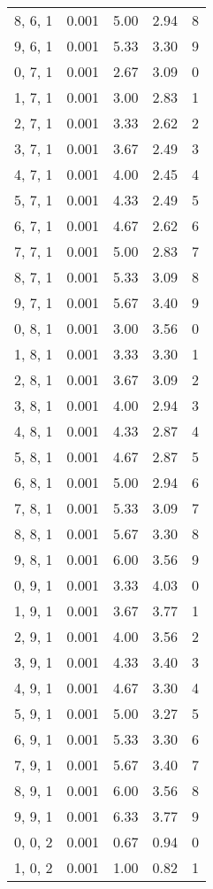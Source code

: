 \documentclass[12pt]{article}
\begin{document}
\begin{tabular}{c || c || c | c | c}
8, 6, 1 & 0.001 & 5.00 & 2.94 & 8 \\
9, 6, 1 & 0.001 & 5.33 & 3.30 & 9 \\
0, 7, 1 & 0.001 & 2.67 & 3.09 & 0 \\
1, 7, 1 & 0.001 & 3.00 & 2.83 & 1 \\
2, 7, 1 & 0.001 & 3.33 & 2.62 & 2 \\
3, 7, 1 & 0.001 & 3.67 & 2.49 & 3 \\
4, 7, 1 & 0.001 & 4.00 & 2.45 & 4 \\
5, 7, 1 & 0.001 & 4.33 & 2.49 & 5 \\
6, 7, 1 & 0.001 & 4.67 & 2.62 & 6 \\
7, 7, 1 & 0.001 & 5.00 & 2.83 & 7 \\
8, 7, 1 & 0.001 & 5.33 & 3.09 & 8 \\
9, 7, 1 & 0.001 & 5.67 & 3.40 & 9 \\
0, 8, 1 & 0.001 & 3.00 & 3.56 & 0 \\
1, 8, 1 & 0.001 & 3.33 & 3.30 & 1 \\
2, 8, 1 & 0.001 & 3.67 & 3.09 & 2 \\
3, 8, 1 & 0.001 & 4.00 & 2.94 & 3 \\
4, 8, 1 & 0.001 & 4.33 & 2.87 & 4 \\
5, 8, 1 & 0.001 & 4.67 & 2.87 & 5 \\
6, 8, 1 & 0.001 & 5.00 & 2.94 & 6 \\
7, 8, 1 & 0.001 & 5.33 & 3.09 & 7 \\
8, 8, 1 & 0.001 & 5.67 & 3.30 & 8 \\
9, 8, 1 & 0.001 & 6.00 & 3.56 & 9 \\
0, 9, 1 & 0.001 & 3.33 & 4.03 & 0 \\
1, 9, 1 & 0.001 & 3.67 & 3.77 & 1 \\
2, 9, 1 & 0.001 & 4.00 & 3.56 & 2 \\
3, 9, 1 & 0.001 & 4.33 & 3.40 & 3 \\
4, 9, 1 & 0.001 & 4.67 & 3.30 & 4 \\
5, 9, 1 & 0.001 & 5.00 & 3.27 & 5 \\
6, 9, 1 & 0.001 & 5.33 & 3.30 & 6 \\
7, 9, 1 & 0.001 & 5.67 & 3.40 & 7 \\
8, 9, 1 & 0.001 & 6.00 & 3.56 & 8 \\
9, 9, 1 & 0.001 & 6.33 & 3.77 & 9 \\
0, 0, 2 & 0.001 & 0.67 & 0.94 & 0 \\
1, 0, 2 & 0.001 & 1.00 & 0.82 & 1 \\

\end{tabular}
\end{document}
